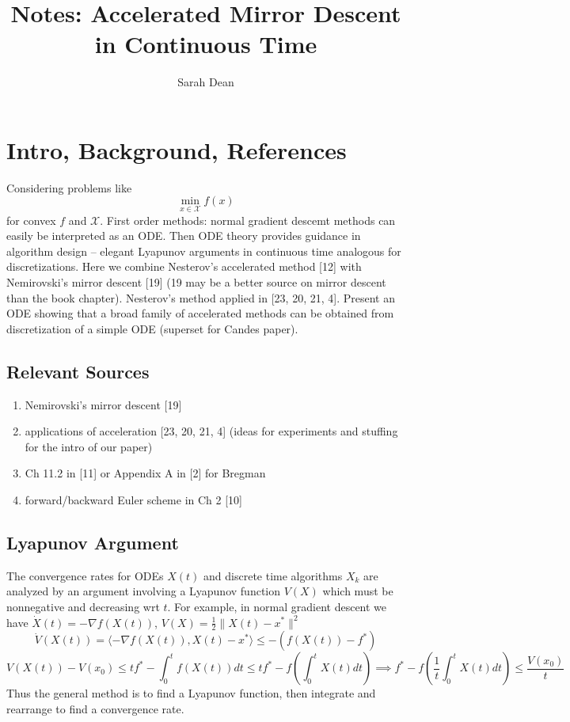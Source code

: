 \documentclass{article}
\title{Notes: Accelerated Mirror Descent in Continuous Time}
\author{Sarah Dean}
\begin{document}
\maketitle

\section{Intro, Background, References}
Considering problems like
\[ \min_{x\in\mathcal{X}} f(x) \]
for convex $f$ and $\mathcal{X}$. First order methods: normal gradient descemt methods can easily be interpreted as an ODE. Then ODE theory provides guidance in algorithm design -- elegant Lyapunov arguments in continuous time analogous for discretizations. Here we combine Nesterov's accelerated method [12] with Nemirovski's mirror descent [19] (19 may be a better source on mirror descent than the book chapter). Nesterov's method applied in [23, 20, 21, 4]. Present an ODE showing that a broad family of accelerated methods can be obtained from discretization of a simple ODE (superset for Candes paper).

\subsection{Relevant Sources}
\begin{enumerate}
    \item Nemirovski's mirror descent [19]
    \item applications of acceleration [23, 20, 21, 4] (ideas for experiments and stuffing for the intro of our paper)
    \item Ch 11.2 in [11] or Appendix A in [2] for Bregman
    \item forward/backward Euler scheme in Ch 2 [10]
\end{enumerate}

\subsection{Lyapunov Argument}
The convergence rates for ODEs $X(t)$ and discrete time algorithms $X_k$ are analyzed by an argument involving a Lyapunov function $V(X)$ which must be nonnegative and decreasing wrt $t$. For example, in normal gradient descent we have $\dot X(t) = -\nabla f(X(t))$, $V(
X) = \frac{1}{2}\|X(t)-x^*\|^2$
\[\dot V(X(t)) = \langle  -\nabla f(X(t)), X(t) - x^*\rangle \leq -(f(X(t)) - f^*)\]
\[ V(X(t)) - V(x_0) \leq tf^* - \int_0^t f(X(t))dt \leq tf^* - f\left(\int_0^t X(t)dt\right) \implies  f^* - f\left(\frac{1}{t}\int_0^t X(t)dt\right) \leq \frac{V(x_0)}{t} \]
Thus the general method is to find a Lyapunov function, then integrate and rearrange to find a convergence rate.
\end{document}
